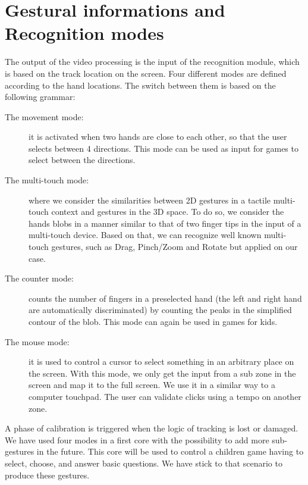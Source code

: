 \documentclass{llncs}
\begin{document}
\section{Gestural informations and Recognition modes}
The output of the video processing is the input of the recognition module,
which is based on the track location on the screen.
Four different modes are defined according to the hand locations. The switch between them is based on the following grammar:
\begin{description}
 \item[The movement mode:] it is activated when two hands are close to each other, so that the user selects between 4 directions. This mode can be used as input for games to select between the directions.
 \item[The multi-touch mode:] where we consider the similarities between 2D gestures in a tactile multi-touch context and gestures in the 3D space. To do so, we consider the hands blobs in a manner similar to that of two finger tips in the input of a multi-touch device. Based on that, we can recognize well known multi-touch gestures, such as Drag, Pinch/Zoom and Rotate but applied on our case.
 \item[The counter mode:] counts the number of fingers in a preselected hand (the left and right hand are automatically discriminated) by counting the peaks in the simplified contour of the blob. This mode can again be used in games for kids.
 \item[The mouse mode:] it is used to control a cursor to select something in an arbitrary place on the screen. With this mode, we only get the input from a sub zone in the screen and map it to the full screen. We use it in a similar way to a computer touchpad.
The user can validate clicks using a tempo on another zone.
\end{description}

A phase of calibration is triggered when the logic of tracking is lost or damaged.
We have used four modes in a first core with the possibility to add more sub-gestures in the future.
This core will be used to control a children game having to select, choose, and answer basic questions.
We have stick to that scenario to produce these gestures. 

\end{document}
